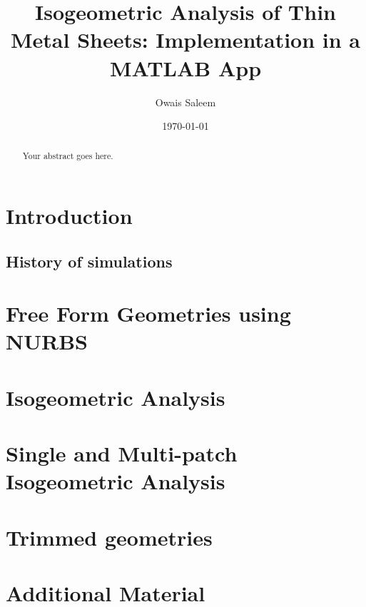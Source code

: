 \documentclass[12pt,a4paper]{report}
\title{\textbf{Isogeometric Analysis of Thin Metal Sheets: Implementation in a MATLAB App}}
\author{Owais Saleem}
\date{\today}
\begin{document}
\maketitle

\begin{abstract}
  Your abstract goes here.
\end{abstract}

\tableofcontents

\listoffigures
\listoftables

\chapter{Introduction}
\section{History of simulations}
\chapter{Free Form Geometries using NURBS}
\chapter{Isogeometric Analysis}
\chapter{Single and Multi-patch Isogeometric Analysis}
\chapter{Trimmed geometries}






\appendix
\chapter{Additional Material}
\end{document}
